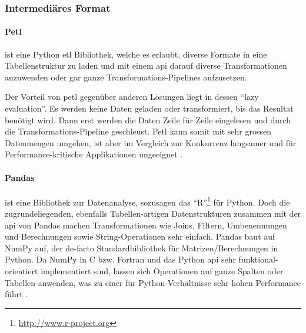 \subsubsection{Intermediäres Format}
\paragraph{Petl} 
ist eine Python \acs{etl} Bibliothek, welche es erlaubt, diverse Formate in eine Tabellenstruktur zu laden und mit einem \acs{api} darauf diverse Transformationen anzuwenden oder gar ganze Transformations-Pipelines aufzusetzen.

Der Vorteil von petl gegenüber anderen Lösungen liegt in dessen ``lazy evaluation''. Es werden keine Daten geladen oder transformiert, bis das Resultat benötigt wird. Dann erst werden die Daten Zeile für Zeile eingelesen und durch die Transformations-Pipeline geschleust. Petl kann somit mit sehr grossen Datenmengen umgehen, ist aber im Vergleich zur Konkurrenz langsamer und für Performance-kritische Applikationen ungeeignet \cite[Intro $\to$ Design goals]{petl}.

\paragraph{Pandas} ist eine Bibliothek zur Datenanalyse, sozusagen das ``R''\footnote{\url{http://www.r-project.org}} für Python. Doch die zugrundeliegenden, ebenfalls Tabellen-artigen Datenstrukturen zusammen mit der \acs{api} von Pandas machen Transformationen wie Joins, Filtern, Umbenennungen und Berechnungen sowie String-Operationen sehr einfach. Pandas baut auf NumPy auf, der de-facto Standardbibliothek für Matrizen/Berechnungen in Python. Da NumPy in C bzw. Fortran und das Python \acs{api} sehr funktional-orientiert implementiert sind, lassen sich Operationen auf ganze Spalten oder Tabellen anwenden, was zu einer für Python-Verhältnisse sehr hohen Performance führt \cite{pandasMergePerformance}.

